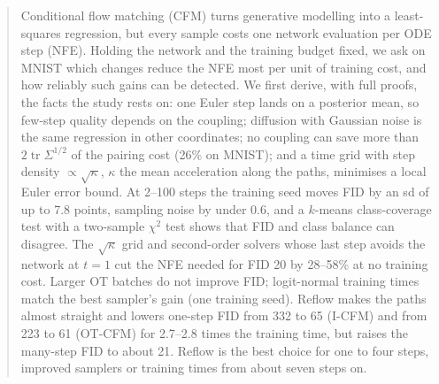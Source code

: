 \begin{abstract}
Conditional flow matching (CFM) turns generative modelling into a least-squares regression, but every sample costs one network evaluation per ODE step (NFE).
Holding the network and the training budget fixed, we ask on MNIST which changes reduce the NFE most per unit of training cost, and how reliably such gains can be detected.
We first derive, with full proofs, the facts the study rests on: one Euler step lands on a posterior mean, so few-step quality depends on the coupling; diffusion with Gaussian noise is the same regression in other coordinates; no coupling can save more than $2\operatorname{tr}\Sigma^{1/2}$ of the pairing cost (26\% on MNIST); and a time grid with step density $\propto\sqrt\kappa$, $\kappa$ the mean acceleration along the paths, minimises a local Euler error bound.
At 2--100 steps the training seed moves FID by an sd of up to 7.8 points, sampling noise by under 0.6, and a $k$-means class-coverage test with a two-sample $\chi^2$ test shows that FID and class balance can disagree.
The $\sqrt\kappa$ grid and second-order solvers whose last step avoids the network at $t=1$ cut the NFE needed for FID 20 by 28--58\% at no training cost.
Larger OT batches do not improve FID; logit-normal training times match the best sampler's gain (one training seed).
Reflow makes the paths almost straight and lowers one-step FID from 332 to 65 (I-CFM) and from 223 to 61 (OT-CFM) for 2.7--2.8 times the training time, but raises the many-step FID to about 21.
Reflow is the best choice for one to four steps, improved samplers or training times from about seven steps on.
\end{abstract}
